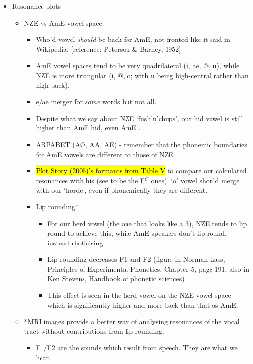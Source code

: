 \documentclass{article}
\begin{document}
\begin{itemize}
\begin{itemize}
        \item Resonance plots
        \begin{itemize}
            \item NZE vs AmE vowel space
            \begin{itemize}
                \item Who'd vowel \textit{should} be back for AmE, not fronted like it said in Wikipedia. [reference: Peterson \& Barney, 1952]
                \item AmE vowel spaces tend to be very quadrilateral (i, ae, @, u), while NZE is more triangular (i, @, o; with u being high-central rather than high-back).
                \item e/ae merger for \textit{some} words but not all.
                \item Despite what we say about NZE `fush'n'chups', our hid vowel is still higher than AmE hid, even AmE .
                \item ARPABET (AO, AA, AE) - remember that the phonemic boundaries for AmE vowels are different to those of NZE.
                \item \hl{Plot Story (2005)'s formants from Table V} to compare our calculated resonances with his (see to be the F$^C$ ones). `o' vowel should merge with our `horde', even if phonemically they are different. 
                \item Lip rounding*
                \begin{itemize}
                    \item For our herd vowel (the one that looks like a 3), NZE tends to lip round to achieve this, while AmE speakers don't lip round, instead rhoticising.
                    \item Lip rounding decreases F1 and F2 (figure in Norman Lass, Principles of Experimental Phonetics, Chapter 5, page 191; also in Ken Stevens, Handbook of phonetic sciences)
                    \item This effect is seen in the herd vowel on the NZE vowel space which is significantly higher and more back than that os AmE.
                \end{itemize}
            \end{itemize}
            \item *MRI images provide a better way of analysing resonances of the vocal tract without contributions from lip rounding.
            \begin{itemize}
                \item F1/F2 are the sounds which result from speech. They are what we hear.

\end{itemize}
\end{itemize}
\end{itemize}
\end{itemize}
\end{document}
